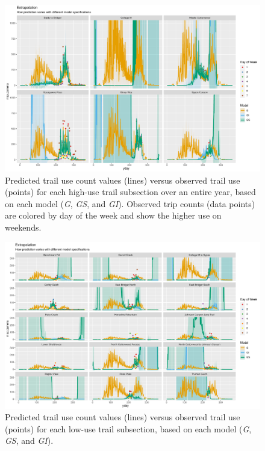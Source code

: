 \documentclass[
]{book}
\begin{document}
\begin{figure}

{\centering \includegraphics[width=1\linewidth]{../figures/high_pred_compare} 

}

\caption{Predicted trail use count values (lines) versus observed trail use (points) for each high-use trail subsection over an entire year, based on each model (\emph{G}, \emph{GS}, and \emph{GI}). Observed trip counts (data points) are colored by day of the week and show the higher use on weekends. }\label{fig:high-compare-pred2}
\end{figure}

\begin{figure}

{\centering \includegraphics[width=1\linewidth]{../figures/low_pred_compare} 

}

\caption{Predicted trail use count values (lines) versus observed trail use (points) for each low-use trail subsection, based on each model (\emph{G}, \emph{GS}, and \emph{GI}).}\label{fig:low-compare-pred2}
\end{figure}
\end{document}
